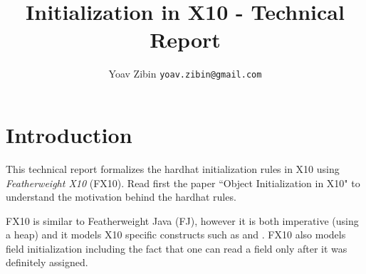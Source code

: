 \documentclass[a4paper]{article}
\title{Initialization in X10 - Technical Report}
\author{Yoav Zibin \texttt{yoav.zibin@gmail.com}}
\date{}
\begin{document}
\maketitle


\lstset{language=java,basicstyle=\ttfamily\small}

\section{Introduction}
This technical report formalizes the hardhat initialization rules in X10
    using \emph{Featherweight X10} (FX10).
Read first the paper ``Object Initialization in X10" to understand the motivation behind the hardhat rules.

FX10 is similar to Featherweight Java (FJ), however it is both imperative (using a heap) and it
    models X10 specific constructs such as \finish and \async.
FX10 also models field initialization including the fact that one can read a field only after it was definitely assigned.
\end{document}
